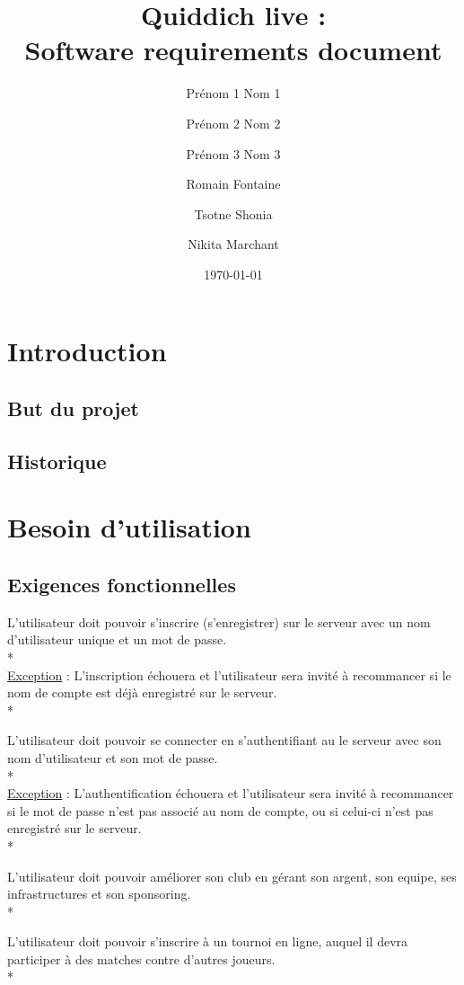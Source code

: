 \documentclass[a4paper]{article}
\title{Quiddich live : \\Software requirements document}
\author{Prénom 1 Nom 1 \and Prénom 2 Nom 2 \and Prénom 3 Nom 3 \and
Romain Fontaine \and Tsotne Shonia \and Nikita Marchant}
\date{\today}
\begin{document}
\maketitle

\section{Introduction}
\subsection{But du projet}

\printglossary[numberedsection]
\subsection{Historique}

\section{Besoin d'utilisation}
	\subsection{Exigences fonctionnelles}
		\begin{description}[style=nextline]
			\item[Inscription :]L'utilisateur doit pouvoir s'inscrire (s'enregistrer) sur le serveur avec un nom d'utilisateur unique et un mot de passe.\\*\\\*\underline{Exception} : L'inscription échouera et l'utilisateur sera invité à recommancer si le nom de compte est déjà enregistré sur le serveur.\\*
			\item[Connection :]L'utilisateur doit pouvoir se connecter en s'authentifiant au le serveur avec son nom d'utilisateur et son mot de passe.\\*\\\*\underline{Exception} : L'authentification échouera et l'utilisateur sera invité à recommancer si le mot de passe n'est pas associé au nom de compte, ou si celui-ci n'est pas enregistré sur le serveur.\\*
			\item[Management :]L'utilisateur doit pouvoir améliorer son \gls{club} en gérant son argent, son \gls{equipe}, ses infrastructures et son sponsoring.\\*
			\item[Tournois :]L'utilisateur doit pouvoir s'inscrire à un tournoi en ligne, auquel il devra participer à des matches contre d'autres joueurs.\\*
		\end{description}
\end{document}
